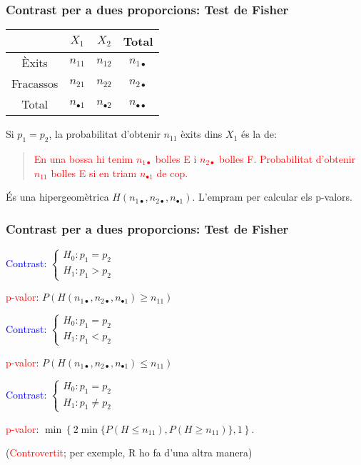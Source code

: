 \documentclass[12pt,t]{beamer}
\newcommand{\red}[1]{\textcolor{red}{#1}}
\newcommand{\blue}[1]{\textcolor{blue}{#1}}
\renewcommand{\leq}{\leqslant}
\renewcommand{\geq}{\geqslant}
\theoremstyle{plain}
\theoremstyle{definition}
\begin{document}
\begin{frame}
\frametitle{Contrast per a dues proporcions: Test de Fisher}
\vspace*{-2ex}

\begin{center}
\begin{tabular}{c|cc|c|}
  & $X_1$ & $X_2$ &  Total\\\hline
Èxits & $n_{11}$ & $n_{12}$ &  $n_{1\bullet}$\\
Fracassos & $n_{21}$ & $n_{22}$ &  $n_{2\bullet}$ \\\hline 
Total & $n_{\bullet1}$ & $n_{\bullet2}$ & $n_{\bullet\bullet}$
\\\hline
\end{tabular}
\end{center}
\medskip

Si $p_1=p_2$, la probabilitat d'obtenir $n_{11}$ èxits dins $X_1$ és la de:
\begin{quote}
\red{En una bossa hi tenim $n_{1\bullet}$ bolles E i $n_{2\bullet}$ bolles F. Probabilitat d'obtenir $n_{11}$ bolles E si en triam $n_{\bullet1}$ de cop.}
\end{quote}
És una hipergeomètrica $H(n_{1\bullet},n_{2\bullet},n_{\bullet1})$. L'empram per calcular els p-valors.

\end{frame}

\begin{frame}
\frametitle{Contrast per a dues proporcions: Test de Fisher}

\blue{Contrast:}
$
\left\{\begin{array}{l}
H_0:p_1=p_2\\
H_1:p_1> p_2
\end{array}\right.
$
\medskip

\red{p-valor}: $P(H(n_{1\bullet},n_{2\bullet},n_{\bullet1})\geq n_{11})$
\bigskip

\blue{Contrast:}
$
\left\{\begin{array}{l}
H_0:p_1=p_2\\
H_1:p_1< p_2
\end{array}\right.
$
\medskip

\red{p-valor}: $P(H(n_{1\bullet},n_{2\bullet},n_{\bullet1})\leq n_{11})$
\bigskip

\blue{Contrast:}
$
\left\{\begin{array}{l}
H_0:p_1=p_2\\
H_1:p_1\neq  p_2
\end{array}\right.
$
\medskip

\red{p-valor}: $\min\left\{2\min\{P(H\leq n_{11}), P(H\geq n_{11})\},1\right\}$.
\medskip
 
(\red{Controvertit}; per exemple, R ho fa d'una altra manera)

\bigskip





\end{frame}
\end{document}
